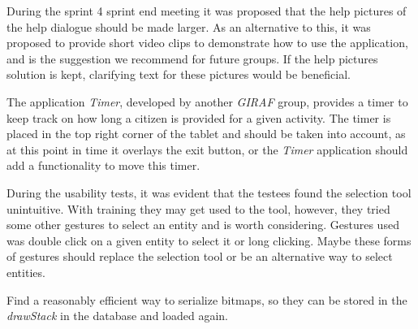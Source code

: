 \begin{description}[style=nextline]
\item[Alternative help dialogue]
During the sprint 4 sprint end meeting it was proposed that the help pictures of the help dialogue should be made larger.
As an alternative to this, it was proposed to provide short video clips to demonstrate how to use the application, and is the suggestion we recommend for future groups.
If the help pictures solution is kept, clarifying text for these pictures would be beneficial.

\item[Placement of timer]
The application \textit{Timer}, developed by another \textit{GIRAF} group, provides a timer to keep track on how long a citizen is provided for a given activity. 
The timer is placed in the top right corner of the tablet and should be taken into account, as at this point in time it overlays the exit button, or the \textit{Timer} application should add a functionality to move this timer.

\item[Reconsider selection of entities]
During the usability tests, it was evident that the testees found the selection tool unintuitive.
With training they may get used to the tool, however, they tried some other gestures to select an entity and is worth considering.
Gestures used was double click on a given entity to select it or long clicking.
Maybe these forms of gestures should replace the selection tool or be an alternative way to select entities.

\item[Saving and loading \textit{drawStack} with bitmaps in the database]
Find a reasonably efficient way to serialize bitmaps, so they can be stored in the \textit{drawStack} in the database and loaded again.

\end{description}